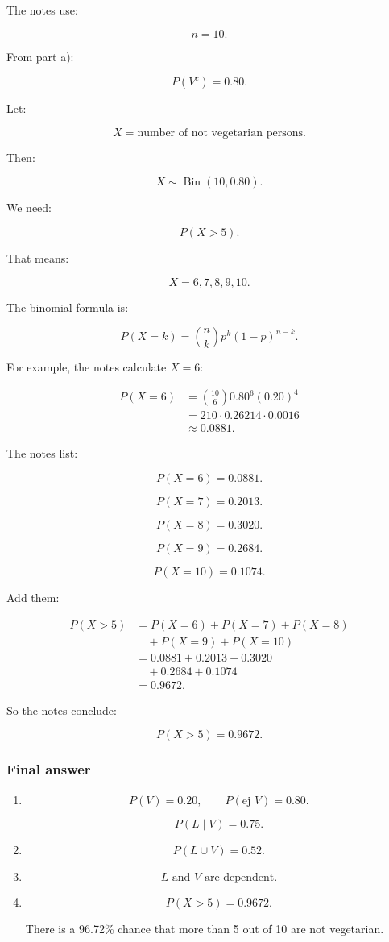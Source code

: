 \documentclass[10pt]{article}
\begin{document}
The notes use:

\[
n=10.
\]

From part a):

\[
P(V^c)=0.80.
\]

Let:

\[
X=\text{number of not vegetarian persons}.
\]

Then:

\[
X\sim \operatorname{Bin}(10,0.80).
\]

We need:

\[
P(X>5).
\]

That means:

\[
X=6,7,8,9,10.
\]

The binomial formula is:

\[
P(X=k)
=
\binom{n}{k}
p^k(1-p)^{n-k}.
\]

For example, the notes calculate \(X=6\):

\begin{align*}
P(X=6)
&=
\binom{10}{6}
0.80^6(0.20)^4 \\[2mm]
&=210\cdot 0.26214\cdot 0.0016 \\[2mm]
&\approx 0.0881.
\end{align*}

The notes list:

\[
P(X=6)=0.0881.
\]

\[
P(X=7)=0.2013.
\]

\[
P(X=8)=0.3020.
\]

\[
P(X=9)=0.2684.
\]

\[
P(X=10)=0.1074.
\]

Add them:

\begin{align*}
P(X>5)
&=P(X=6)+P(X=7)+P(X=8) \\
&\quad +P(X=9)+P(X=10) \\[2mm]
&=0.0881+0.2013+0.3020 \\
&\quad +0.2684+0.1074 \\[2mm]
&=0.9672.
\end{align*}

So the notes conclude:

\[
P(X>5)=0.9672.
\]

\subsubsection*{Final answer}
\begin{enumerate}[label=\alph*)]
\item
\[
P(V)=0.20,
\qquad
P(\text{ej }V)=0.80.
\]

\[
P(L\mid V)=0.75.
\]

\item
\[
P(L\cup V)=0.52.
\]

\item
\[
L \text{ and } V
\text{ are dependent.}
\]

\item
\[
P(X>5)=0.9672.
\]

There is a 96.72\% chance that more than 5 out of
10 are not vegetarian.
\end{enumerate}
\end{document}
